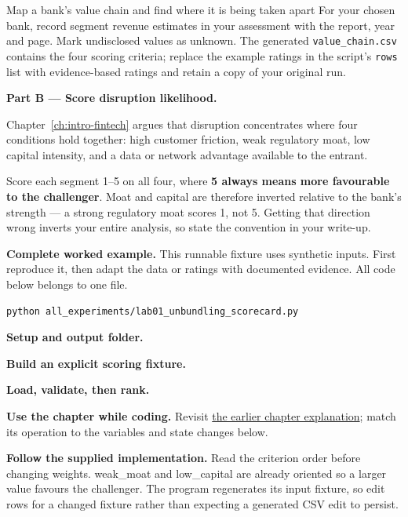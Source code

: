 \begin{labproject}{Map a bank's value chain and find where it is being taken apart}
For your chosen bank, record segment revenue estimates in your assessment with the report, year and page. Mark undisclosed values as unknown. The generated \texttt{value\_chain.csv} contains the four scoring criteria; replace the example ratings in the script's \texttt{rows} list with evidence-based ratings and retain a copy of your original run.

\medskip\noindent\textbf{Part B --- Score disruption likelihood.}\par
Chapter~\ref{ch:intro-fintech} argues that disruption concentrates where four conditions hold together: high customer friction, weak regulatory moat, low capital intensity, and a data or network advantage available to the entrant.

Score each segment 1--5 on all four, where \textbf{5 always means more favourable to the challenger}. Moat and capital are therefore inverted relative to the bank's strength --- a strong regulatory moat scores 1, not 5. Getting that direction wrong inverts your entire analysis, so state the convention in your write-up.



\textbf{Complete worked example.} This runnable fixture uses synthetic inputs. First reproduce it, then adapt the data or ratings with documented evidence. All code below belongs to one file.
\begin{lstlisting}[style=utpterminal]
python all_experiments/lab01_unbundling_scorecard.py
\end{lstlisting}

\noindent\textbf{Setup and output folder.}


\noindent\textbf{Build an explicit scoring fixture.}


\noindent\textbf{Load, validate, then rank.}



\textbf{Use the chapter while coding.} Revisit \hyperref[ch:intro-fintech]{the earlier chapter explanation}; match its operation to the variables and state changes below.

\textbf{Follow the supplied implementation.} Read the criterion order before changing weights. weak\_moat and low\_capital are already oriented so a larger value favours the challenger. The program regenerates its input fixture, so edit rows for a changed fixture rather than expecting a generated CSV edit to persist.



\end{labproject}
